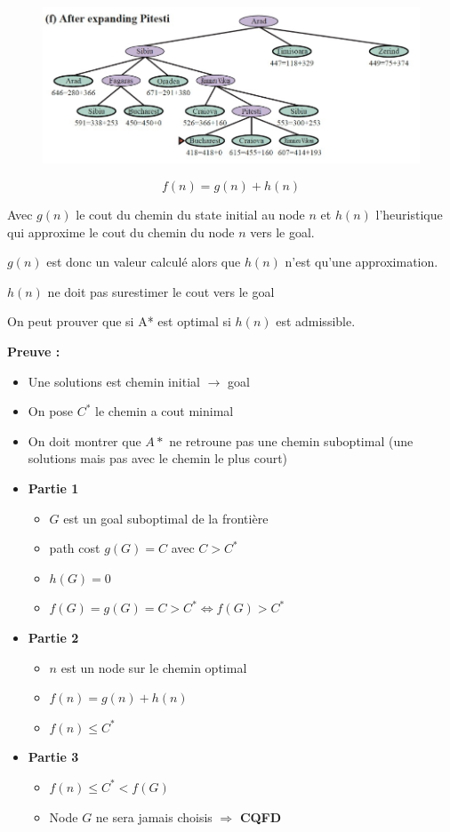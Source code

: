\begin{figure}[H]
		\end{figure}\begin{figure}[H]
			\centering
			\includegraphics[width=\textwidth]{img/A5.png}
		\end{figure}
		
		\begin{equation}
			f(n) = g(n) + h(n)
		\end{equation}
		
		Avec $g(n)$ le cout du chemin du state initial au node $n$ et $h(n)$ l'heuristique qui approxime le cout du chemin du node $n$ vers le goal.
		
		$g(n)$ est donc un valeur calculé alors que $h(n)$ n'est qu'une approximation.
		
		$h(n)$ ne doit pas surestimer le cout vers le goal
		
		On peut prouver que si A* est optimal si $h(n)$ est admissible.
		
		\textbf{Preuve :}
		\begin{itemize}
			\item Une solutions est chemin initial $\rightarrow$ goal
			\item On pose $C^*$ le chemin a cout minimal
			\item On doit montrer que $A*$ ne retroune pas une chemin suboptimal (une solutions mais pas avec le chemin le plus court)
			\item \textbf{Partie 1}
			\begin{itemize}
				\item $G$ est un goal suboptimal de la frontière
				\item path cost $g(G) = C$ avec $C > C^*$
				\item $h(G) = 0$
				\item $f(G) = g(G) = C > C^* \Leftrightarrow f(G) > C^*$
			\end{itemize}
			\item \textbf{Partie 2}
			\begin{itemize}
				\item $n$ est un node sur le chemin optimal
				\item $f(n) = g(n) + h(n)$
				\item $f(n) \leq C^*$
			\end{itemize}
			\item \textbf{Partie 3}
			\begin{itemize}
				\item $f(n) \leq C^* < f(G)$
				\item Node $G$ ne sera jamais choisis $\Rightarrow$ \textbf{CQFD}
			\end{itemize}
		\end{itemize}
		

